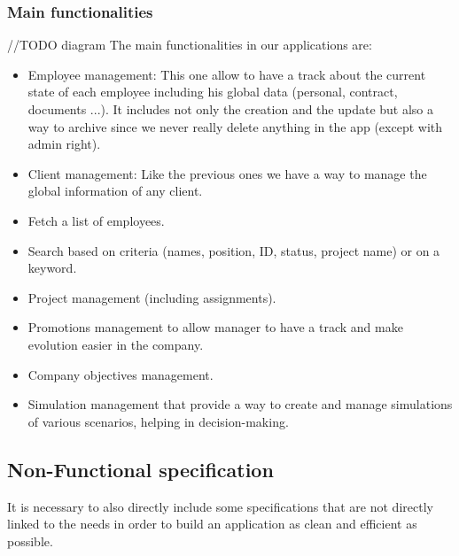 \documentclass[12pt,a4paper,table,english]{article}
\begin{document}
	\subsubsection{Main functionalities}
	//TODO diagram
	The main functionalities in our applications are:
	\begin{itemize}		
		\item Employee management: This one allow to have a track about the current state of each employee including his global data (personal, contract, documents ...). It includes not only the creation and the update but also a way to archive since we never really delete anything in the app (except with admin right).
		
		\item Client management: Like the previous ones we have a way to manage the global information of any client.
		
		\item Fetch a list of employees.
		
		\item Search based on criteria (names, position, ID, status, project name) or on a keyword.
		
		\item Project management (including assignments).
		
		\item Promotions management to allow manager to have a track and make evolution easier in the company.
		
		\item Company objectives management.
		
		\item Simulation management that provide a way to create and manage simulations of various scenarios, helping in decision-making.
		
	\end{itemize}


	\newpage
	
	\subsection{Non-Functional specification}
	
	It is necessary to also directly include some specifications that are not directly linked to the needs in order to build an application as clean and efficient as possible.
	
\end{document}
